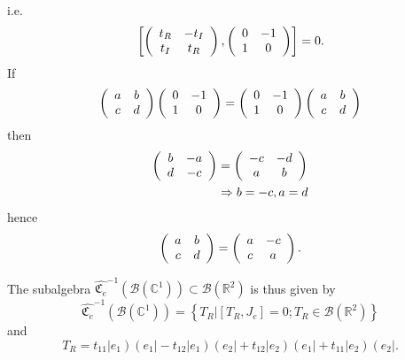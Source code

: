 \documentclass[aps,preprint]{revtex4}%
\begin{document}
i.e.
\begin{equation}
\left[  \left(
\begin{array}
[c]{cc}%
t_{R} & -t_{I}\\
t_{I} & t_{R}%
\end{array}
\right)  ,\left(
\begin{array}
[c]{cc}%
0 & -1\\
1 & 0
\end{array}
\right)  \right]  =0.
\end{equation}
If
\begin{equation}
\left(
\begin{array}
[c]{cc}%
a & b\\
c & d
\end{array}
\right)  \left(
\begin{array}
[c]{cc}%
0 & -1\\
1 & 0
\end{array}
\right)  =\left(
\begin{array}
[c]{cc}%
0 & -1\\
1 & 0
\end{array}
\right)  \left(
\begin{array}
[c]{cc}%
a & b\\
c & d
\end{array}
\right)
\end{equation}
then
\begin{align}
\left(
\begin{array}
[c]{cc}%
b & -a\\
d & -c
\end{array}
\right)   &  =\left(
\begin{array}
[c]{cc}%
-c & -d\\
a & b
\end{array}
\right) \\
&  \Rightarrow b=-c,a=d
\end{align}
hence
\begin{equation}
\left(
\begin{array}
[c]{cc}%
a & b\\
c & d
\end{array}
\right)  =\left(
\begin{array}
[c]{cc}%
a & -c\\
c & a
\end{array}
\right)  .
\end{equation}


The subalgebra $\widehat{\mathfrak{C}_{e}}^{-1}\left(  \mathcal{B}\left(
\mathbb{C}^{1}\right)  \right)  \subset\mathcal{B}\left(  \mathbb{R}%
^{2}\right)  $ is thus given by
\begin{equation}
\widehat{\mathfrak{C}_{e}}^{-1}\left(  \mathcal{B}\left(  \mathbb{C}%
^{1}\right)  \right)  =\left\{  \left.  T_{R}\right\vert \left[  T_{R}%
,J_{e}\right]  =0;T_{R}\in\mathcal{B}\left(  \mathbb{R}^{2}\right)  \right\}
\end{equation}
and
\begin{equation}
T_{R}=t_{11}\left\vert e_{1}\right)  \left(  e_{1}\right\vert -t_{12}%
\left\vert e_{1}\right)  \left(  e_{2}\right\vert +t_{12}\left\vert
e_{2}\right)  \left(  e_{1}\right\vert +t_{11}\left\vert e_{2}\right)  \left(
e_{2}\right\vert .
\end{equation}
\end{document}
